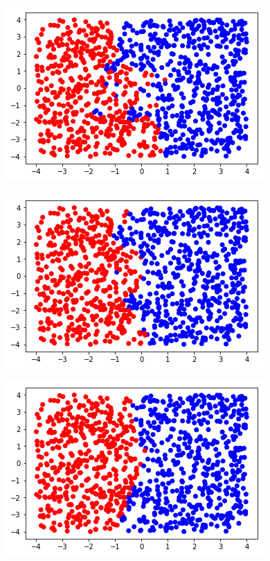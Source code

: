 \documentclass[12pt, a4paper]{article}
\begin{document}
\begin{figure}[H]
	\begin{minipage}[b]{.3\linewidth}
		\includegraphics[width = \textwidth]{mil_puntos_1_vecino}
		\label{fig:mil_1}
	\end{minipage}
	\begin{minipage}[b]{.3\linewidth}
		\includegraphics[width = \textwidth]{mil_puntos_3_vecino}
		\label{fig:mil_3}
	\end{minipage}
	\begin{minipage}[b]{.3\linewidth}
		\includegraphics[width = \textwidth]{mil_puntos_13_vecino}

\end{minipage}
\end{figure}
\end{document}
